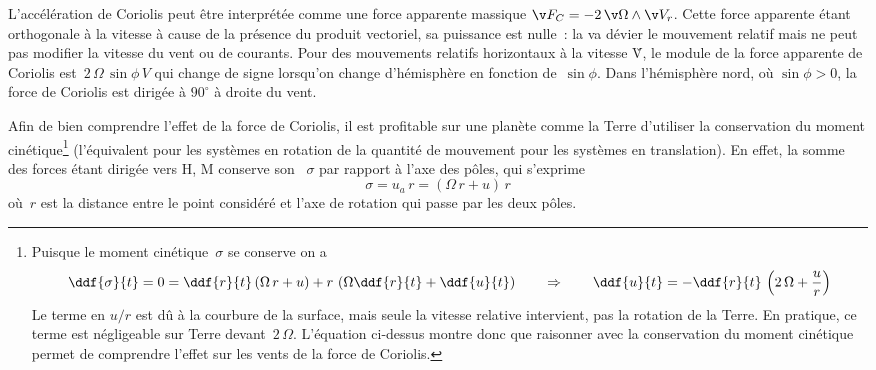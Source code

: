 \sk
L'accélération de Coriolis peut être interprétée comme une force apparente massique $\v F_C = - 2 \, \v \Omega\wedge\v V_r$. Cette force apparente étant orthogonale à la vitesse à cause de la présence du produit vectoriel, sa puissance est nulle~: la  va dévier le mouvement relatif mais ne peut pas modifier la vitesse du vent ou de courants. Pour des mouvements relatifs horizontaux à la vitesse \v V, le module de la force apparente de Coriolis est~$2 \, \Omega \, \sin \phi \, V$ qui change de signe lorsqu'on change d'hémisphère en fonction de~$\sin \phi$. Dans l'hémisphère nord, où $\sin \phi>0$, la force de Coriolis est dirigée à $90^{\circ}$ à droite du vent. 

\sk
Afin de bien comprendre l'effet de la force de Coriolis, il est profitable sur une planète comme la Terre d'utiliser la conservation du moment cinétique\footnote{
Puisque le moment cinétique~$\sigma$ se conserve on a \[ \ddf{\sigma}{t} = 0 = \ddf{r}{t} \, (\Omega \, r + u) + r \, \left( \Omega \ddf{r}{t}+\ddf{u}{t} \right) \qquad \Rightarrow \qquad \ddf{u}{t} = - \ddf{r}{t}  \, \left( 2\,\Omega + \frac{u}{r} \right) \] 
Le terme en $u/r$ est dû à la courbure de la surface, mais seule la vitesse relative intervient, pas la rotation de la Terre. En pratique, ce terme est négligeable sur Terre devant~$2 \, \Omega$. L'équation ci-dessus montre donc que raisonner avec la conservation du moment cinétique permet de comprendre l'effet sur les vents de la force de Coriolis.
}
(l'équivalent pour les systèmes en rotation de la quantité de mouvement pour les systèmes en translation). En effet, la somme des forces étant dirigée vers H, M conserve son ~$\sigma$ par rapport à l'axe des pôles, qui s'exprime
\[ \boxed{ \sigma = u_a \, r = (\Omega \, r + u) \, r } \]
où~$r$ est la distance entre le point considéré et l'axe de rotation qui passe par les deux pôles.

